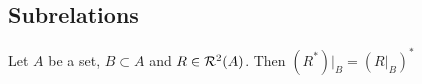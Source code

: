 



































































\subsection{Subrelations}

\begin{ex}
	Let $A$ be a set, $B \subset A$ and $R \in \mathcal{R}^2(A)$. Then 
	$(R^*)|_B = (R|_B)^*$
\end{ex}

